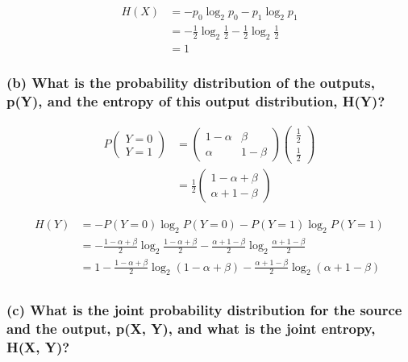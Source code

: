 \[
\begin{aligned}
H(X)
&=−p_0\log_2{p_0}−p_1\log_2{p_1}\\
&=−\frac12\log_2{\frac12}−\frac12\log_2{\frac12}\\
&=1
\end{aligned}
\]

\hypertarget{b-what-is-the-probability-distribution-of-the-outputs-py-and-the-entropy-of-this-output-distribution-hy}{%
\subsubsection{(b) What is the probability distribution of the outputs,
p(Y), and the entropy of this output distribution,
H(Y)?}\label{b-what-is-the-probability-distribution-of-the-outputs-py-and-the-entropy-of-this-output-distribution-hy}}

\[
\begin{aligned}
P\begin{pmatrix}
Y=0\\
Y=1
\end{pmatrix}
&=\begin{pmatrix}
1-\alpha&\beta\\
\alpha&1-\beta
\end{pmatrix}
\begin{pmatrix}
\frac12\\
\frac12
\end{pmatrix}\\
&=\frac12\begin{pmatrix}
1-\alpha+\beta\\
\alpha+1-\beta
\end{pmatrix}
\end{aligned}
\]

\[
\begin{aligned}
H(Y)
&=-P(Y=0)\log_2{P(Y=0)}-P(Y=1)\log_2{P(Y=1)}\\
&=-\frac{1-\alpha+\beta}2\log_2{\frac{1-\alpha+\beta}2}-\frac{\alpha+1-\beta}2\log_2{\frac{\alpha+1-\beta}2}\\
&=1-\frac{1-\alpha+\beta}2\log_2\left(1-\alpha+\beta\right)-\frac{\alpha+1-\beta}2\log_2\left(\alpha+1-\beta\right)\\
\end{aligned}
\]

\hypertarget{c-what-is-the-joint-probability-distribution-for-the-source-and-the-output-px-y-and-what-is-the-joint-entropy-hx-y}{%
\subsubsection{(c) What is the joint probability distribution for the
source and the output, p(X, Y), and what is the joint entropy, H(X,
Y)?}\label{c-what-is-the-joint-probability-distribution-for-the-source-and-the-output-px-y-and-what-is-the-joint-entropy-hx-y}}

